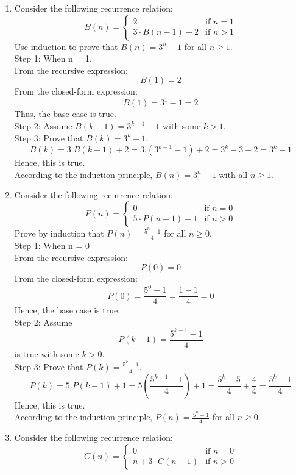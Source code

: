 \documentclass[12pt]{article}
\begin{document}
\begin{enumerate}
    \item Consider the following recurrence relation:
    \[
    B(n) = 
    \begin{cases}
    2 & \text{if } n = 1 \\
    3 \cdot B(n-1) + 2 & \text{if } n > 1
    \end{cases}
    \]
    Use induction to prove that $B(n) = 3^n - 1$ for all $n \geq 1$.\\
    Step 1: When n = 1.\\
    From the recursive expression:
    \[B(1) = 2\]
    From the closed-form expression:
    \[B(1) = 3^1 - 1 = 2\]
    Thus, the base case is true.\\
    Step 2: Assume $B(k-1) = 3^{k-1} - 1$ with some $k > 1$.\\
    Step 3: Prove that $B(k) = 3^k -1$.
    \[B(k) = 3.B(k-1) + 2 = 3.(3^{k-1} - 1) + 2 = 3^k - 3 + 2 = 3^k - 1\]
    Hence, this is true.\\
    According to the induction principle, $B(n) = 3^n - 1$ with all $n \geq 1$.
    \item Consider the following recurrence relation:
    \[
    P(n) = 
    \begin{cases}
    0 & \text{if } n = 0 \\
    5 \cdot P(n-1) + 1 & \text{if } n > 0
    \end{cases}
    \]
    Prove by induction that $P(n) = \frac{5^n-1}{4}$ for all $n \geq 0$.\\
    Step 1: When n = 0\\
    From the recursive expression:
    \[P(0) = 0\]
    From the closed-form expression:
    \[P(0) = \frac{5^0 - 1}{4} = \frac{1-1}{4} = 0\]
    Hence, the base case is true.\\
    Step 2: Assume 
    \[P(k-1) = \frac{5^{k-1}-1}{4}\]
    is true with some $k > 0$.\\
    Step 3: Prove that $P(k) = \frac{5^k-1}{4}$.
    \[P(k) = 5.P(k-1) + 1 = 5(\frac{5^{k-1}-1}{4}) + 1 = \frac{5^{k}-5}{4} + \frac{4}{4} = \frac{5^{k}-1}{4}\]
    Hence, this is true.\\
    According to the induction principle, $P(n) = \frac{5^n-1}{4}$ for all $n \geq 0$.
    \item Consider the following recurrence relation:
    \[
    C(n) = 
    \begin{cases}
    0 & \text{if } n = 0 \\
    n + 3 \cdot C(n-1) & \text{if } n > 0
    \end{cases}
    \]

\end{enumerate}
\end{document}
